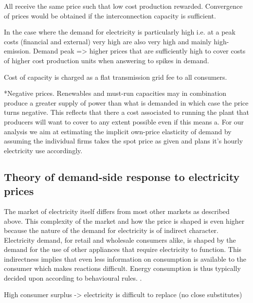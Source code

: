 All receive the same price such that low cost production rewarded. Convergence of prices would be obtained if the interconnection capacity is sufficient.

In the case where the demand for electricity is particularly high i.e. at a peak costs (financial and external) very high are also very high and mainly high-emission. Demand peak => higher prices that are sufficiently high to cover costs of higher cost production units 
when answering to spikes in demand.  

Cost of capacity is charged as a flat transmission grid fee to all consumers. 

*Negative prices. Renewables and must-run capacities may in combination produce a greater supply of power than what is demanded in which case the price turns negative. This reflects that there a cost associated to running the plant that producers will want to cover to any extent possible even if this means a. 
For our analysis we aim at estimating the implicit own-price elasticity of demand by assuming the individual firms takes the spot price as given and plans it's hourly electricity use accordingly.
\smallskip \\


\subsection{Theory of demand-side response to electricity prices}
\label{subsec:t_demand}
The market of electricity itself differs from most other markets as described above. This complexity of the market and how the price is shaped is even higher because the nature of the demand for electricity is of indirect character. Electricity demand, for retail and wholesale consumers alike, is shaped by the demand for the use of other appliances that require electricity to function. 
This indirectness implies that even less information on consumption is available to the consumer which makes reactions difficult. Energy consumption is thus typically decided upon according to behavioural rules. \citep{kirschen2003demand}. 

High consumer surplus -> electricity is difficult to replace (no close substitutes) 

